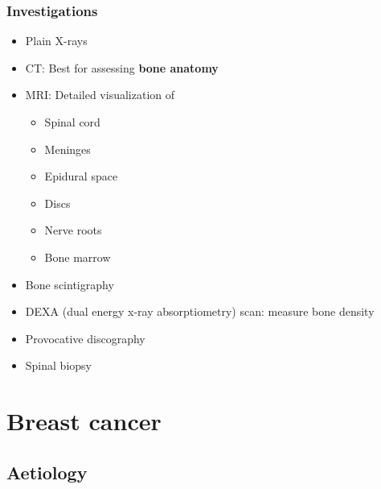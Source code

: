\documentclass[
  14pt,
]{memoir}
\providecommand{\tightlist}{%
  \setlength{\itemsep}{0pt}\setlength{\parskip}{0pt}}
\begin{document}
\hypertarget{investigations-1}{%
\subsection{Investigations}\label{investigations-1}}

\begin{itemize}
\tightlist
\item
  Plain X-rays
\item
  CT: Best for assessing \textbf{bone anatomy}
\item
  MRI: Detailed visualization of

  \begin{itemize}
  \tightlist
  \item
    Spinal cord
  \item
    Meninges
  \item
    Epidural space
  \item
    Discs
  \item
    Nerve roots
  \item
    Bone marrow
  \end{itemize}
\item
  Bone scintigraphy
\item
  DEXA (dual energy x-ray absorptiometry) scan: measure bone density
\item
  Provocative discography
\item
  Spinal biopsy
\end{itemize}

\pagebreak

\hypertarget{breast-cancer}{%
\chapter{Breast cancer}\label{breast-cancer}}

\hypertarget{aetiology}{%
\section{Aetiology}\label{aetiology}}
\end{document}
